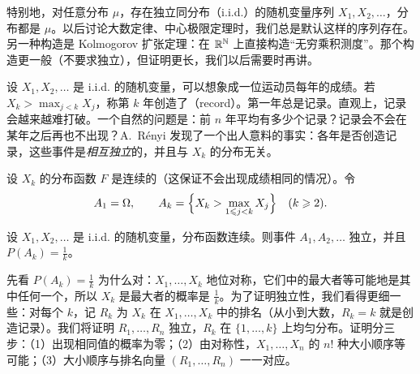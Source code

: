 \begin{remark}
特别地，对任意分布 $\mu$，存在独立同分布（i.i.d.）的随机变量序列 $X_1,X_2,\dots$，分布都是 $\mu$。以后讨论大数定律、中心极限定理时，我们总是默认这样的序列存在。另一种构造是 Kolmogorov 扩张定理：在 $\mathbb{R}^{\mathbb{N}}$ 上直接构造“无穷乘积测度”。那个构造更一般（不要求独立），但证明更长，我们以后需要时再讲。
\end{remark}


设 $X_1,X_2,\dots$ 是 i.i.d. 的随机变量，可以想象成一位运动员每年的成绩。若 $X_k>\max_{j<k}X_j$，称第 $k$ 年创造了（record）。第一年总是记录。直观上，记录会越来越难打破。一个自然的问题是：前 $n$ 年平均有多少个记录？记录会不会在某年之后再也不出现？A.\ Rényi 发现了一个出人意料的事实：各年是否创造记录，这些事件是\emph{相互独立}的，并且与 $X_k$ 的分布无关。

设 $X_k$ 的分布函数 $F$ 是连续的（这保证不会出现成绩相同的情况）。令
\[
A_1=\Omega,\qquad A_k=\Bigl\{X_k>\max_{1\leqslant j<k}X_j\Bigr\}\quad(k\geqslant2).
\]

\begin{theorem}\label{thm:independence:records}
设 $X_1,X_2,\dots$ 是 i.i.d. 的随机变量，分布函数连续。则事件 $A_1,A_2,\dots$ 独立，并且 $P(A_k)=\frac1k$。
\end{theorem}

\begin{remark}[证明思路]
先看 $P(A_k)=\frac1k$ 为什么对：$X_1,\dots,X_k$ 地位对称，它们中的最大者等可能地是其中任何一个，所以 $X_k$ 是最大者的概率是 $\frac1k$。为了证明独立性，我们看得更细一些：对每个 $k$，记 $R_k$ 为 $X_k$ 在 $X_1,\dots,X_k$ 中的排名（从小到大数，$R_k=k$ 就是创造记录）。我们将证明 $R_1,\dots,R_n$ 独立，$R_k$ 在 $\{1,\dots,k\}$ 上均匀分布。证明分三步：（1）出现相同值的概率为零；（2）由对称性，$X_1,\dots,X_n$ 的 $n!$ 种大小顺序等可能；（3）大小顺序与排名向量 $(R_1,\dots,R_n)$ 一一对应。
\end{remark}

